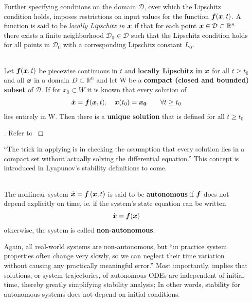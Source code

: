 \documentclass[12pt]{ucthesis}
\begin{document}
Further specifying conditions on the domain $\mathcal{D}$, over which the Lipschitz condition holds, imposes restrictions on input values for the function $\boldsymbol{f}(\boldsymbol{x},t)$. A function is said to be \textit{locally Lipschitz in} $\boldsymbol{x}$ if that for each point $\boldsymbol{x} \in \mathcal{D} \subset \mathbb{R}^n$ there exists a finite neighborhood $\mathcal{D}_0 \in \mathcal{D}$ such that the Lipschitz condition holds for all points in $\mathcal{D}_0$ with a corresponding Lipschitz constant $L_0$.

\begin{thm} \alignright \citet[Thm 2.4]{Khalil1996}\\
	Let $\boldsymbol{f}(\boldsymbol{x},t)$ be piecewise continuous in $t$ and \textbf{locally Lipschitz in} $\boldsymbol{x}$ for all $t \geq t_0$ and all $\boldsymbol{x}$ in a domain $D \subset \mathbb{R}^n$ and let W be a \textbf{compact (closed and bounded) subset} of $\mathcal{D}$. If for $x_0 \subset W$ it is known that every solution of
	$$ \dot{\boldsymbol{x}} = \boldsymbol{f}(\boldsymbol{x},t), \quad \boldsymbol{x}(t_0) = \boldsymbol{x_0} \qquad \forall t \geq t_0$$
	lies entirely in W. Then there is a \textbf{unique solution} that is defined for all $t \geq t_0$
	\label{thm: lipschitz}
\end{thm}

\begin{proof}[]
	Refer to \citet[Pg. 77]{Khalil1996}
\end{proof}

``The trick in applying  is in checking the assumption that every solution lies in a compact set without actually solving the differential equation.'' This concept is introduced in Lyapunov's stability definitions to come.

\begin{defn} \alignright \citet{Slotine1991} \\
	The nonlinear system $\dot{\boldsymbol{x}} = \boldsymbol{f} \left( \boldsymbol{x},t \right)$ is said to be \textbf{autonomous} if $\boldsymbol{f}$ does not depend explicitly on time, ie. if the system's state equation can be written
	\begin{equation}
		\dot{\boldsymbol{x}} = \boldsymbol{f}(\boldsymbol{x})
		\label{eq: x_dot_auto}
	\end{equation}
	otherwise, the system is called \textbf{non-autonomous}. 
	\label{defn: auto}
\end{defn}
%
Again, all real-world systems are non-autonomous, but ``in practice system properties often change very slowly, so we can neglect their time variation without causing any practically meaningful error.''\citep{Slotine1991} Most importantly,  implies that solutions, or system trajectories, of autonomous ODEs are independent of initial time, thereby greatly simplifying stability analysis; In other words, stability for autonomous systems does not depend on initial conditions.
\end{document}
